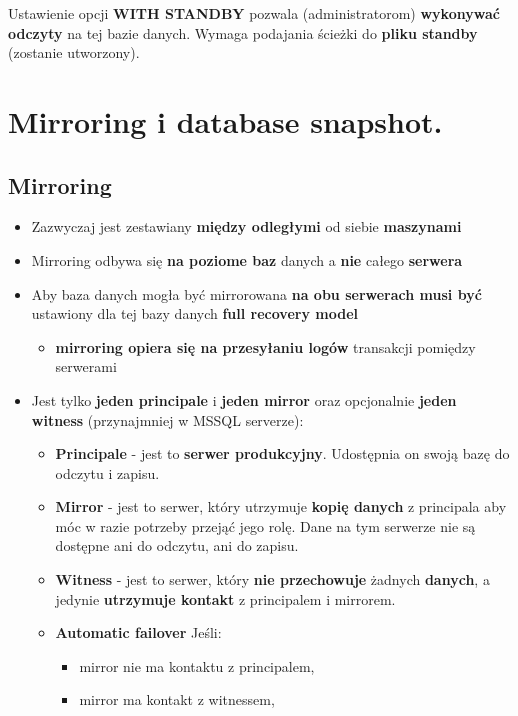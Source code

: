 \documentclass[a4paper]{article}
\begin{document}
    Ustawienie opcji \textbf{WITH STANDBY} pozwala (administratorom) \textbf{wykonywać odczyty} na tej bazie danych. Wymaga
    podajania ścieżki do \textbf{pliku standby} (zostanie utworzony).

    \section{Mirroring i database snapshot.}
    \subsection{Mirroring}
    \begin{itemize}
        \item Zazwyczaj jest zestawiany \textbf{między odległymi} od siebie \textbf{maszynami}
        \item Mirroring odbywa się \textbf{na poziome baz} danych a \textbf{nie} całego \textbf{serwera}
        \item Aby baza danych mogła być mirrorowana \textbf{na obu serwerach musi być} ustawiony dla tej bazy danych \textbf{full recovery model}
        \begin{itemize}
            \item \textbf{mirroring opiera się na przesyłaniu logów} transakcji pomiędzy serwerami
        \end{itemize}
        \item Jest tylko \textbf{jeden principale} i \textbf{jeden mirror} oraz opcjonalnie \textbf{jeden witness} (przynajmniej w MSSQL serverze):
        \begin{itemize}
            \item \textbf{Principale} - jest to \textbf{serwer produkcyjny}. Udostępnia on swoją bazę do odczytu i zapisu.
            \item \textbf{Mirror} - jest to serwer, który utrzymuje \textbf{kopię danych} z principala aby móc w razie potrzeby przejąć jego rolę. Dane na tym serwerze nie są dostępne ani do odczytu, ani do zapisu.
            \item \textbf{Witness} - jest to serwer, który \textbf{nie przechowuje} żadnych \textbf{danych}, a jedynie \textbf{utrzymuje kontakt} z principalem i mirrorem.
            \item \textbf{Automatic failover}
            Jeśli:
            \begin{itemize}
                \item mirror nie ma kontaktu z principalem,
                \item mirror ma kontakt z witnessem,

\end{itemize}
\end{itemize}
\end{itemize}
\end{document}
